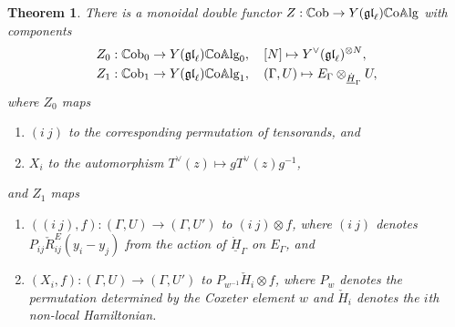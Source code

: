\documentclass[11pt]{report}
\newtheorem{theorem}{Theorem}[section]
\theoremstyle{definition}
\theoremstyle{remark}
\theoremstyle{remark}
\begin{document}
\begin{theorem}
There is a monoidal double functor $Z: \mathbb{C}\textnormal{ob} \to Y(\mathfrak{gl}_\ell)\mathbb{C}\textnormal{o}\mathbb{A}\textnormal{lg}$ with components
\begin{align*}
Z_0&: \mathbb{C}\textnormal{ob}_0 \to Y(\mathfrak{gl}_\ell)\mathbb{C}\textnormal{o}\mathbb{A}\textnormal{lg}_0, \quad [N] \mapsto Y^\vee(\mathfrak{gl}_\ell)^{\otimes N}, \\
Z_1&: \mathbb{C}\textnormal{ob}_1 \to Y(\mathfrak{gl}_\ell)\mathbb{C}\textnormal{o}\mathbb{A}\textnormal{lg}_1, \quad (\Gamma,U) \mapsto E_\Gamma \otimes_{\underline{\dot H}_\Gamma} U,
\end{align*}
where $Z_0$ maps
\begin{enumerate}[label=(\roman*)]
\item $(i \ j)$ to the corresponding permutation of tensorands, and
\item $X_i$ to the automorphism $T^\vee(z) \mapsto gT^\vee(z)g^{-1}$,
\end{enumerate}
and $Z_1$ maps
\begin{enumerate}[label=(\roman*)]
\item $((i \ j),f): (\Gamma,U) \to (\Gamma,U')$ to $(i \ j) \otimes f$, where $(i \ j)$ denotes $P_{ij} \check R_{ij}^E(y_i-y_j)$ from the action of $\underline{\dot H}_\Gamma$ on $E_\Gamma$, and
\item $(X_i,f): (\Gamma,U) \to (\Gamma,U')$ to $P_{w^{-1}} \check H_i \otimes f$, where $P_w$ denotes the permutation determined by the Coxeter element $w$ and $\check H_i$ denotes the $i$th non-local Hamiltonian.
\end{enumerate}
\end{theorem}
\end{document}
